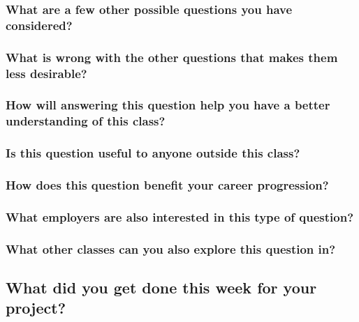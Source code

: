 \documentclass[letterpaper]{article}            %
\begin{document}
\subsubsection{What are a few other possible questions you have considered?}



\subsubsection{What is wrong with the other questions that makes them less desirable?}



\subsubsection{How will answering this question help you have a better understanding of this class?}



\subsubsection{Is this question useful to anyone outside this class?}



\subsubsection{How does this question benefit your career progression?}



\subsubsection{What employers are also interested in this type of question?}



\subsubsection{What other classes can you also explore this question in?}




\subsection{What did you get done this week for your project?}
\end{document}
